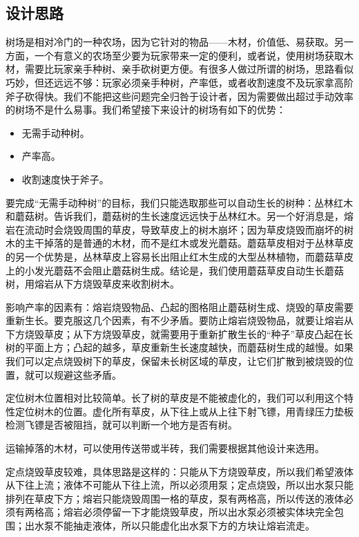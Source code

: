\subsection{设计思路}
树场是相对冷门的一种农场，因为它针对的物品——木材，价值低、易获取。另一方面，一个有意义的农场至少要为玩家带来一定的便利，或者说，使用树场获取木材，需要比玩家亲手种树、亲手砍树更方便。有很多人做过所谓的树场，思路看似巧妙，但还远远不够：玩家必须亲手种树，产率低，或者收割速度不及玩家拿高阶斧子砍得快。我们不能把这些问题完全归咎于设计者，因为需要做出超过手动效率的树场不是什么易事。我们希望接下来设计的树场有如下的优势：
\begin{itemize}
\item 无需手动种树。
\item 产率高。
\item 收割速度快于斧子。
\end{itemize}

要完成“无需手动种树”的目标，我们只能选取那些可以自动生长的树种：丛林红木和蘑菇树。告诉我们，蘑菇树的生长速度远远快于丛林红木。另一个好消息是，熔岩在流动时会烧毁周围的草皮，导致草皮上的树木崩坏；因为草皮烧毁而崩坏的树木的主干掉落的是普通的木材，而不是红木或发光蘑菇。蘑菇草皮相对于丛林草皮的另一个优势是，丛林草皮上容易长出阻止红木生成的大型丛林植物，而蘑菇草皮上的小发光蘑菇不会阻止蘑菇树生成。结论是，我们使用蘑菇草皮自动生长蘑菇树，用熔岩从下方烧毁草皮来收割树木。

影响产率的因素有：熔岩烧毁物品、凸起的图格阻止蘑菇树生成、烧毁的草皮需要重新生长。要克服这几个因素，有不少矛盾。要防止熔岩烧毁物品，就要让熔岩从下方烧毁草皮；从下方烧毁草皮，就需要用于重新扩散生长的“种子”草皮凸起在长树的平面上方；凸起的越多，草皮重新生长速度越快，而蘑菇树生成的越慢。如果我们可以定点烧毁树下的草皮，保留未长树区域的草皮，让它们扩散到被烧毁的位置，就可以规避这些矛盾。

定位树木位置相对比较简单。长了树的草皮是不能被虚化的，我们可以利用这个特性定位树木的位置。虚化所有草皮，从下往上或从上往下射飞镖，用青绿压力垫板检测飞镖是否被阻挡，就可以判断一个地方是否有树。

运输掉落的木材，可以使用传送带或半砖，我们需要根据其他设计来选用。

定点烧毁草皮较难，具体思路是这样的：只能从下方烧毁草皮，所以我们希望液体从下往上流；液体不可能从下往上流，所以必须用泵；定点烧毁，所以出水泵只能排列在草皮下方；熔岩只能烧毁周围一格的草皮，泵有两格高，所以传送的液体必须有两格高；熔岩必须停留一下才能烧毁草皮，所以出水泵必须被实体块完全包围；出水泵不能抽走液体，所以只能虚化出水泵下方的方块让熔岩流走。

